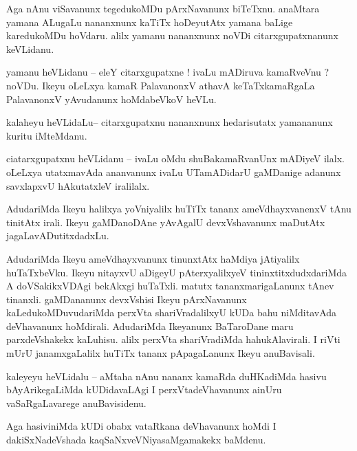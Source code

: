 \documentclass{article}
\begin{document}
\begin{mn}%
Aga nAnu viSavanunx tegedukoMDu pArxNavanunx biTeTxnu. anaMtara yamana ALugaLu nananxnunx kaTiTx 
hoDeyutAtx yamana baLige karedukoMDu hoVdaru. alilx yamanu nananxnunx noVDi citarxgupatxnanunx 
keVLidanu.
\end{mn}

\begin{mn}%
yamanu heVLidanu -- eleY citarxgupatxne ! ivaLu mADiruva kamaRveVnu ? noVDu. Ikeyu oLeLxya kamaR 
PalavanonxV athavA keTaTxkamaRgaLa PalavanonxV yAvudanunx hoMdabeVkoV heVLu.
\end{mn}

\begin{mn}%
kalaheyu heVLidaLu-- citarxgupatxnu nananxnunx hedarisutatx yamananunx kuritu iMteMdanu.
\end{mn}

\begin{mn}%
ciatarxgupatxnu heVLidanu -- ivaLu oMdu shuBakamaRvanUnx mADiyeV ilalx. oLeLxya utatxmavAda 
ananvanunx ivaLu UTamADidarU gaMDanige adanunx savxlapxvU hAkutatxleV iralilalx.
\end{mn}

\begin{mn}%
AdudariMda Ikeyu halilxya yoVniyalilx huTiTx tananx ameVdhayxvanenxV tAnu tinitAtx irali. Ikeyu 
gaMDanoDAne yAvAgalU devxVshavanunx maDutAtx jagaLavADutitxdadxLu.
\end{mn}

\begin{mn}%
AdudariMda Ikeyu ameVdhayxvanunx tinunxtAtx haMdiya jAtiyalilx huTaTxbeVku. Ikeyu nitayxvU aDigeyU 
pAterxyalilxyeV tininxtitxdudxdariMda A doVSakikxVDAgi bekAkxgi huTaTxli. matutx 
tananxmarigaLanunx tAnev tinanxli. gaMDananunx devxVshisi Ikeyu pArxNavanunx kaLedukoMDuvudariMda 
perxVta shariVradalilxyU kUDa bahu niMditavAda deVhavanunx hoMdirali. AdudariMda Ikeyanunx 
BaTaroDane maru parxdeVshakekx kaLuhisu. alilx perxVta shariVradiMda hahukAlavirali. I riVti mUrU 
janamxgaLalilx huTiTx tananx pApagaLanunx Ikeyu anuBavisali.
\end{mn}

\begin{mn}%
kaleyeyu heVLidalu -- aMtaha nAnu nananx kamaRda duHKadiMda hasivu bAyArikegaLiMda kUDidavaLAgi I 
perxVtadeVhavanunx ainUru vaSaRgaLavarege anuBavisidenu.
\end{mn}

\begin{mn}%
Aga hasiviniMda kUDi obabx vataRkana deVhavanunx hoMdi I dakiSxNadeVshada kaqSaNxveVNiyasaMgamakekx 
baMdenu.
\end{mn}
\end{document}
